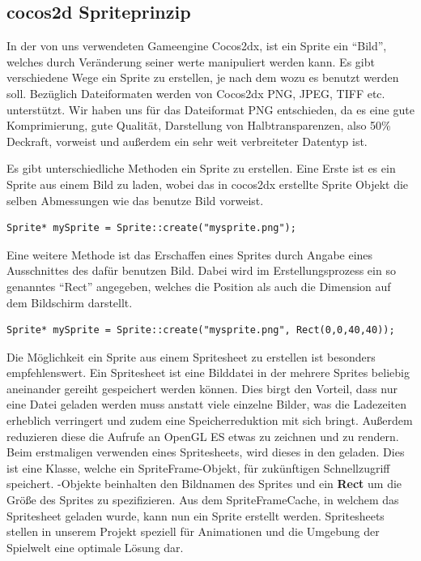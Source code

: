 \subsection{cocos2d Spriteprinzip}
In der von uns verwendeten Gameengine Cocos2dx, ist ein Sprite ein “Bild”, welches durch Veränderung seiner werte manipuliert werden kann. Es gibt verschiedene Wege ein Sprite zu erstellen, je nach dem wozu es benutzt werden soll. Bezüglich Dateiformaten werden von Cocos2dx PNG, JPEG, TIFF etc. unterstützt. Wir haben uns für das Dateiformat PNG entschieden, da es eine gute Komprimierung, gute Qualität, Darstellung von Halbtransparenzen, also 50\% Deckraft, vorweist und außerdem ein sehr weit verbreiteter Datentyp ist.

Es gibt unterschiedliche Methoden ein Sprite zu erstellen. Eine Erste ist es ein Sprite aus einem Bild zu laden, wobei das in cocos2dx erstellte Sprite Objekt die selben Abmessungen wie das benutze Bild vorweist. 

\begin{lstlisting}[style=singleline]
Sprite* mySprite = Sprite::create("mysprite.png");
\end{lstlisting}

Eine weitere Methode ist das Erschaffen eines Sprites durch Angabe eines Ausschnittes des dafür benutzen Bild. Dabei wird im Erstellungsprozess ein so genanntes “Rect” angegeben, welches die Position als auch die Dimension auf dem Bildschirm darstellt. 

\begin{lstlisting}[style=singleline]
Sprite* mySprite = Sprite::create("mysprite.png", Rect(0,0,40,40));
\end{lstlisting}

Die Möglichkeit ein Sprite aus einem Spritesheet zu erstellen ist besonders empfehlenswert. Ein Spritesheet ist eine Bilddatei in der mehrere Sprites beliebig aneinander gereiht gespeichert werden können. Dies birgt den Vorteil, dass nur eine Datei geladen werden muss anstatt viele einzelne Bilder, was die Ladezeiten erheblich verringert und zudem eine Speicherreduktion mit sich bringt. Außerdem reduzieren diese die Aufrufe an OpenGL ES etwas zu zeichnen und zu rendern. Beim erstmaligen verwenden eines Spritesheets, wird dieses in den  geladen.  Dies ist eine Klasse, welche ein SpriteFrame-Objekt, für zukünftigen Schnellzugriff speichert. -Objekte beinhalten den Bildnamen des Sprites und ein \textbf{Rect} um die Größe des Sprites zu spezifizieren. Aus dem SpriteFrameCache, in welchem das Spritesheet geladen wurde, kann nun ein Sprite erstellt werden.
Spritesheets stellen in unserem Projekt speziell für Animationen und die Umgebung der Spielwelt eine optimale Lösung dar. 



